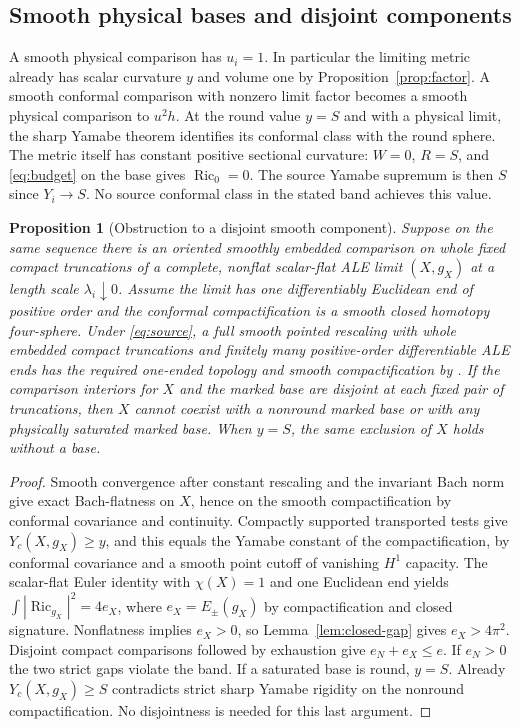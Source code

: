 \documentclass[11pt]{article}
\newtheorem{proposition}[theorem]{Proposition}
\theoremstyle{definition}
\theoremstyle{remark}
\begin{document}
\subsection{Smooth physical bases and disjoint components}

A smooth physical comparison has \(u_i=1\). In particular the limiting metric already has scalar curvature \(y\) and volume one by Proposition~\ref{prop:factor}. A smooth conformal comparison with nonzero limit factor becomes a smooth physical comparison to \(u^2h\). At the round value \(y=S\) and with a physical limit, the sharp Yamabe theorem identifies its conformal class with the round sphere. The metric itself has constant positive sectional curvature: \(W=0\), \(R=S\), and \eqref{eq:budget} on the base gives \(\operatorname{Ric}_0=0\). The source Yamabe supremum is then \(S\) since \(Y_i\to S\). No source conformal class in the stated band achieves this value.

\begin{proposition}[Obstruction to a disjoint smooth component]\label{prop:ale-exclusion}
Suppose on the same sequence there is an oriented smoothly embedded comparison on whole fixed compact truncations of a complete, nonflat scalar-flat ALE limit \((X,g_X)\) at a length scale \(\lambda_i\downarrow0\). Assume the limit has one differentiably Euclidean end of positive order and the conformal compactification is a smooth closed homotopy four-sphere. Under \eqref{eq:source}, a full smooth pointed rescaling with whole embedded compact truncations and finitely many positive-order differentiable ALE ends has the required one-ended topology and smooth compactification by \cite[\S\S11.3--11.4]{Baker2026TwistorSections}. If the comparison interiors for \(X\) and the marked base are disjoint at each fixed pair of truncations, then \(X\) cannot coexist with a nonround marked base or with any physically saturated marked base. When \(y=S\), the same exclusion of \(X\) holds without a base.
\end{proposition}
\begin{proof}
Smooth convergence after constant rescaling and the invariant Bach norm give exact Bach-flatness on \(X\), hence on the smooth compactification by conformal covariance and continuity. Compactly supported transported tests give \(Y_c(X,g_X)\ge y\), and this equals the Yamabe constant of the compactification, by conformal covariance and a smooth point cutoff of vanishing \(H^1\) capacity. The scalar-flat Euler identity with \(\chi(X)=1\) and one Euclidean end yields \(\int|\operatorname{Ric}_{g_X}|^2=4e_X\), where \(e_X=E_\pm(g_X)\) by compactification and closed signature. Nonflatness implies \(e_X>0\), so Lemma~\ref{lem:closed-gap} gives \(e_X>4\pi^2\). Disjoint compact comparisons followed by exhaustion give \(e_N+e_X\le e\). If \(e_N>0\) the two strict gaps violate the band. If a saturated base is round, \(y=S\). Already \(Y_c(X,g_X)\ge S\) contradicts strict sharp Yamabe rigidity on the nonround compactification. No disjointness is needed for this last argument.
\end{proof}
\end{document}
